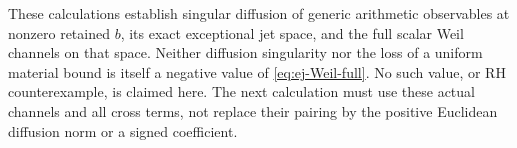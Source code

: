 These calculations establish singular diffusion of generic arithmetic
observables at nonzero retained $b$, its exact exceptional jet space,
and the full scalar Weil channels on that space. Neither diffusion
singularity nor the loss of a uniform material bound is itself a
negative value of \eqref{eq:ej-Weil-full}. No such value, or RH
counterexample, is claimed here. The next calculation must use these
actual channels and all cross terms, not replace their pairing by the
positive Euclidean diffusion norm or a signed coefficient.
